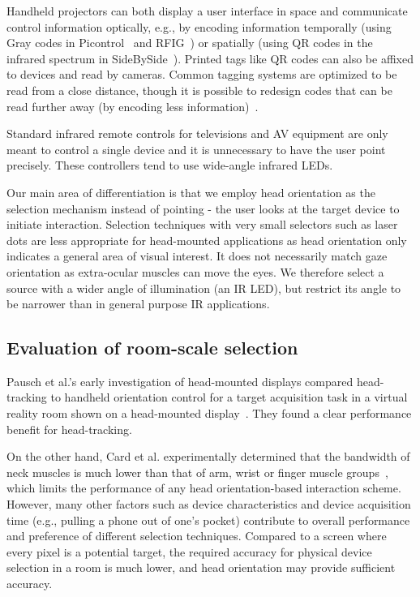 Handheld projectors can both display a user interface in space and communicate control information optically, e.g., by encoding information temporally (using Gray codes in Picontrol~\cite{schmidt_picontrol:_2012} and RFIG~\cite{raskar_rfig_2004}) or spatially (using QR codes in the infrared spectrum in SideBySide~\cite{willis_sidebyside:_2011}). Printed tags like QR codes can also be affixed to devices and read by cameras. Common tagging systems are optimized to be read from a close distance, though it is possible to redesign codes that can be read further away (by encoding less information)~\cite{cross_low-cost_2012}. 

Standard infrared remote controls for televisions and AV equipment are only meant to control a single device and it is unnecessary to have the user point precisely. These controllers tend to use wide-angle infrared LEDs.

Our main area of differentiation is that we employ head orientation as the selection mechanism instead of pointing - the user looks at the target device to initiate interaction. Selection techniques with very small selectors such as laser dots are less appropriate for head-mounted applications as head orientation only indicates a general area of visual interest. It does not necessarily match gaze orientation as extra-ocular muscles can move the eyes. We therefore select a source with a wider angle of illumination (an IR LED), but restrict its angle to be narrower than in general purpose IR applications.

\subsection{Evaluation of room-scale selection}
Pausch et al.'s early investigation of head-mounted displays compared head-tracking to handheld orientation control for a target acquisition task in a virtual reality room shown on a head-mounted display~\cite{pausch_user_1993}. They found a clear performance benefit for head-tracking.

On the other hand, Card et al. experimentally determined that the bandwidth of neck muscles is much lower than that of arm, wrist or finger muscle groups~\cite{card_morphological_1991}, which limits the performance of any head orientation-based interaction scheme. However, many other factors such as device characteristics and device acquisition time (e.g., pulling a phone out of one's pocket) contribute to overall performance and preference of different selection techniques.  Compared to a screen where every pixel is a potential target, the required accuracy for physical device selection in a room is much lower, and head orientation may provide sufficient accuracy.

